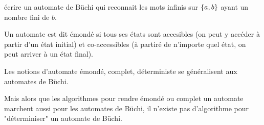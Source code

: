 \begin{exercice}
	écrire un automate de Büchi qui reconnait les mots infinis sur $\left\{a,b\right\}$ ayant un nombre fini de $b$. \\
	\begin{minipage}{0.3\textwidth}
	\end{minipage}
	\begin{minipage}{0.3\textwidth}
	\end{minipage}
	\begin{minipage}{0.3\textwidth}
	\end{minipage}
\end{exercice}


\begin{definition}
	Un automate est dit émondé si tous ses états sont accesibles (on peut y accéder à partir d'un état initial)
	et co-accessibles (à partiré de n'importe quel état, on peut arriver à un état final).
\end{definition}

Les notions d'automate émondé, complet, déterministe se généralisent aux automates de Büchi.


Mais alors que les algorithmes pour rendre émondé ou complet un automate marchent aussi
pour les automates de Büchi, il n'existe pas d'algorithme pour "déterminiser" un automate de Büchi.

